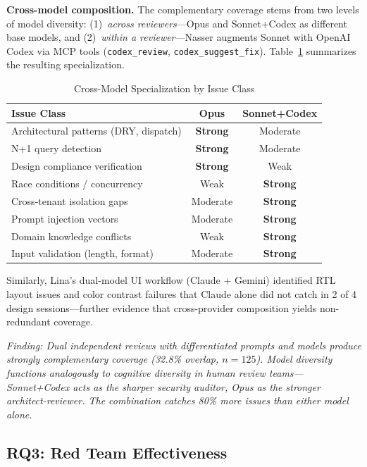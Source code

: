 \documentclass[11pt,a4paper]{article}
\begin{document}
\textbf{Cross-model composition.} The complementary coverage stems from two levels of model diversity: (1)~\textit{across reviewers}---Opus and Sonnet+Codex as different base models, and (2)~\textit{within a reviewer}---Nasser augments Sonnet with OpenAI Codex via MCP tools (\texttt{codex\_review}, \texttt{codex\_suggest\_fix}). Table~\ref{tab:crossmodelstrengths} summarizes the resulting specialization.

\begin{table}[htbp]
\caption{Cross-Model Specialization by Issue Class}
\label{tab:crossmodelstrengths}
\centering
\footnotesize
\begin{tabular}{@{}lcc@{}}
\toprule
\textbf{Issue Class} & \textbf{Opus} & \textbf{Sonnet+Codex} \\
\midrule
Architectural patterns (DRY, dispatch) & \textbf{Strong} & Moderate \\
N+1 query detection & \textbf{Strong} & Moderate \\
Design compliance verification & \textbf{Strong} & Weak \\
Race conditions / concurrency & Weak & \textbf{Strong} \\
Cross-tenant isolation gaps & Moderate & \textbf{Strong} \\
Prompt injection vectors & Moderate & \textbf{Strong} \\
Domain knowledge conflicts & Weak & \textbf{Strong} \\
Input validation (length, format) & Moderate & \textbf{Strong} \\
\bottomrule
\end{tabular}
\end{table}

Similarly, Lina's dual-model UI workflow (Claude + Gemini) identified RTL layout issues and color contrast failures that Claude alone did not catch in 2 of 4 design sessions---further evidence that cross-provider composition yields non-redundant coverage.

\textit{Finding: Dual independent reviews with differentiated prompts and models produce strongly complementary coverage (32.8\% overlap, $n=125$). Model diversity functions analogously to cognitive diversity in human review teams---Sonnet+Codex acts as the sharper security auditor, Opus as the stronger architect-reviewer. The combination catches 80\% more issues than either model alone.}

\subsection{RQ3: Red Team Effectiveness}
\label{sec:rq3}
\end{document}
